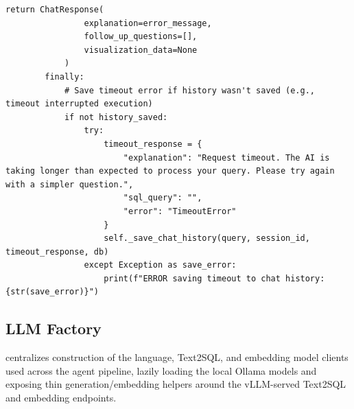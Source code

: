 \begin{lstlisting}[style=python, numbers=none, caption={Text2SQL chat service (\code{text2sql\_service.py})}, label={lst:text2sql-service}]
            return ChatResponse(
                explanation=error_message,
                follow_up_questions=[],
                visualization_data=None
            )
        finally:
            # Save timeout error if history wasn't saved (e.g., timeout interrupted execution)
            if not history_saved:
                try:
                    timeout_response = {
                        "explanation": "Request timeout. The AI is taking longer than expected to process your query. Please try again with a simpler question.",
                        "sql_query": "",
                        "error": "TimeoutError"
                    }
                    self._save_chat_history(query, session_id, timeout_response, db)
                except Exception as save_error:
                    print(f"ERROR saving timeout to chat history: {str(save_error)}")
\end{lstlisting}

\subsection{LLM Factory}
\label{sub:llm-factory}

 centralizes construction of the language,
Text2SQL, and embedding model clients used across the agent pipeline,
lazily loading the local Ollama models and exposing thin
generation/embedding helpers around the vLLM-served Text2SQL and
embedding endpoints.

